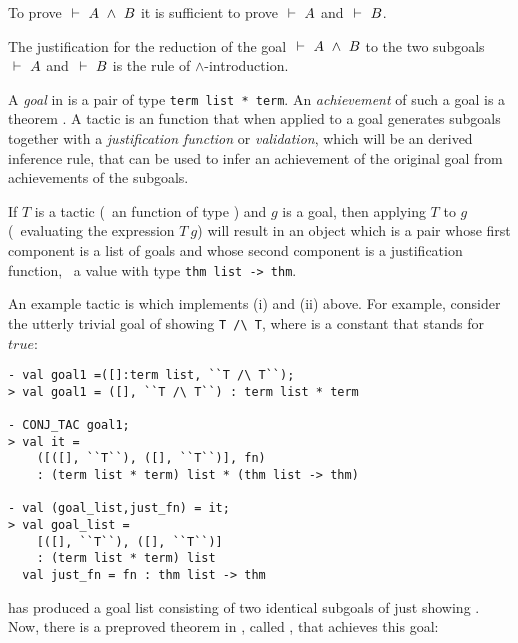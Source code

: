 \begin{myenumerate}
\item To prove $\ \vdash\  A \ \wedge\  B$ it is sufficient to
      prove $\ \vdash\  A$ and $\ \vdash\  B$.
\item The justification for the reduction of the
goal  $\ \vdash\  A \ \wedge\  B$  to the two  subgoals  $\ \vdash\  A$
and $\ \vdash\  B$ is the rule of $\wedge$-introduction.
\end{myenumerate}

A {\it goal\/} in \HOL{} is a pair  of
\ML{} type {\small\verb|term list * term|}. An {\it achievement\/} of
such a goal is a theorem .  A tactic
is an \ML{} function that when applied to a goal generates subgoals
together with a {\it justification function\/} or {\it validation\/},
which will be an \ML{} derived inference rule, that can be used to
infer an achievement of the original goal from achievements of the
subgoals.

If $T$ is a tactic (\ie\ an \ML{} function of type ) and $g$ is a goal, then applying $T$ to
$g$ (\ie\ evaluating the \ML{} expression $T\ g$) will result in an
object which is a pair whose first component is a list of goals and
whose second component is a justification function, \ie\ a value with
\ML{} type {\small\verb|thm list -> thm|}.

An example tactic is  which implements (i) and (ii)
above.  For example, consider the utterly trivial goal of showing
{\small\verb|T /\ T|}, where  is a constant that stands for
$true$:

\begin{session}\begin{verbatim}
- val goal1 =([]:term list, ``T /\ T``);
> val goal1 = ([], ``T /\ T``) : term list * term

- CONJ_TAC goal1;
> val it =
    ([([], ``T``), ([], ``T``)], fn)
    : (term list * term) list * (thm list -> thm)

- val (goal_list,just_fn) = it;
> val goal_list =
    [([], ``T``), ([], ``T``)]
    : (term list * term) list
  val just_fn = fn : thm list -> thm
\end{verbatim}\end{session}

\noindent {} has produced a goal  list consisting  of two identical
subgoals of just showing .  Now, there is a preproved
theorem in \HOL, called , that achieves this goal:

